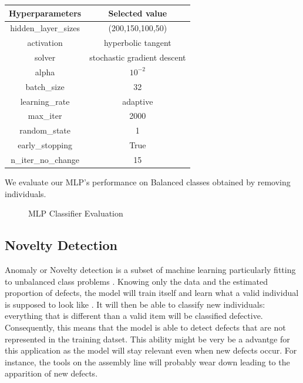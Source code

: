\begin{center}
    \begin{tabular}{|c|c|}
        \hline
        \textbf{Hyperparameters} & \textbf{Selected value} \\ \hline
        hidden\_layer\_sizes & (200,150,100,50) \\ \hline
        activation  & hyperbolic tangent \\ \hline
        solver & stochastic gradient descent \\ \hline
        alpha & \(10^{-2}\)  \\ \hline
        batch\_size & 32 \\ \hline
        learning\_rate & adaptive \\ \hline
        max\_iter & 2000 \\ \hline
        random\_state & 1 \\ \hline
        early\_stopping & True \\ \hline
        n\_iter\_no\_change & 15\\ \hline
    \end{tabular}
\end{center}

We evaluate our MLP's performance on Balanced classes obtained by removing individuals.

\begin{figure}
    \centering
    \qquad
    \caption{MLP Classifier Evaluation}
    \label{mlp}
\end{figure}


\subsection{Novelty Detection}
Anomaly or Novelty detection is a subset of machine learning particularly fitting to unbalanced class problems \cite{novel_scikit}. Knowing only the data and the estimated proportion of defects, the model will train itself and learn what a valid individual is supposed to look like \cite{novel_yt}. It will then be able to classify new individuals: everything that is different than a valid item will be classified defective. Consequently, this means that the model is able to detect defects that are not represented in the training datset. This ability might be very be a advantge for this application as the model will stay relevant even when new defects occur. For instance, the tools on the assembly line will probably wear down leading to the apparition of new defects.